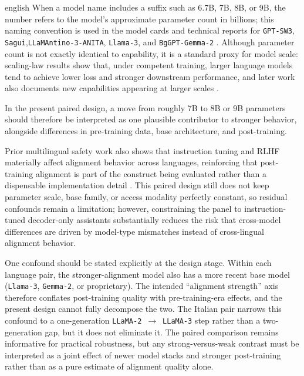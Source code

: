 \begin{otherlanguage*}{english}
When a model name includes a suffix such as 6.7B, 7B, 8B, or 9B, the number refers to the model's approximate parameter count in billions; this naming convention is used in the model cards and technical reports for \texttt{GPT-SW3}, \texttt{Sagui},\texttt{LLaMAntino-3-ANITA}, \texttt{Llama-3}, and \texttt{BgGPT-Gemma-2} \cite{ekgren-etal-2024-gpt,OliveiraJLT2024Sagui7BInstruct01,swapUnibaLLaMAntino3ANITA8BInstDPOITA2026,grattafioriLlama3Herd2024,alexandrovBgGPT10Extending2024}. Although parameter count is not exactly identical to capability, it is a standard proxy for model scale: scaling-law results show that, under competent training, larger language models tend to achieve lower loss and stronger downstream performance, and later work also documents new capabilities appearing at larger scales \cite{kaplanScalingLawsNeural,hoffmannTrainingComputeoptimalLarge2022,weiEmergentAbilitiesLarge2022}.

In the present paired design, a move from roughly 7B to 8B or 9B parameters should therefore be interpreted as one plausible contributor to stronger behavior, alongside differences in pre-training data, base architecture, and post-training.

Prior multilingual safety work also shows that instruction tuning and RLHF materially affect alignment behavior across languages, reinforcing that post-training alignment is part of the construct being evaluated rather than a dispensable implementation detail
\cite{shenLanguageBarrierDissecting2024}. This paired design still does not keep parameter scale, base family, or access modality perfectly constant, so residual confounds remain a limitation; however, constraining the panel to instruction-tuned decoder-only assistants substantially reduces the risk that cross-model differences are driven by model-type mismatches instead of cross-lingual alignment behavior.

One confound should be stated explicitly at the design stage. Within each language pair, the stronger-alignment model also has a more recent base model (\texttt{Llama-3}, \texttt{Gemma-2}, or proprietary). The intended ``alignment strength'' axis therefore conflates post-training quality with pre-training-era effects, and the present design cannot fully decompose the two. The Italian pair narrows this confound to a one-generation \texttt{LLaMA-2}~$\rightarrow$~\texttt{LLaMA-3} step rather than a two-generation gap, but it does not eliminate it. The paired comparison remains informative for practical robustness, but any strong-versus-weak contrast must be interpreted as a joint effect of newer model stacks and stronger post-training rather than as a pure estimate of alignment quality alone.


\end{otherlanguage*}
